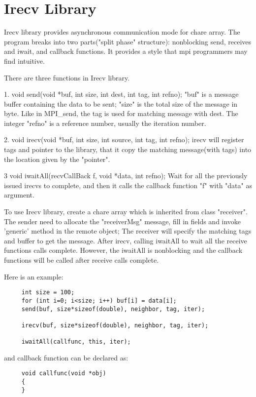 \section{Irecv Library}

{\sc Irecv} library provides asynchronous communication mode for chare array. The program breaks into two parts("split phase" structure): nonblocking send, receives and iwait, and callback functions. It provides a style that mpi programmers may find intuitive. 

There are three functions in Irecv library.

1. void send(void *buf, int size, int dest, int tag, int refno);
"buf" is a message buffer containing the data to be sent; "size" is the total size of the message in byte. 
Like in MPI\_send, the tag is used for matching message with dest. The integer "refno" is a reference number, usually the iteration number.
  

2. void irecv(void *buf, int size, int source, int tag, int refno);
irecv will register tags and pointer to the library, that it copy the matching message(with tags) into the location given by the "pointer".

3 void iwaitAll(recvCallBack f, void *data, int refno);
Wait for all the previously issued irecvs to complete, and then it calls the callback function "f" with "data" as argument.

To use Irecv library, create a chare array which is inherited from class "receiver". The sender need to allocate the "receiverMsg" message, fill in fields and invoke 'generic' method in the remote object; The receiver will specify the matching tags and buffer to get the message. After irecv, calling iwaitAll to wait all the receive functions calls complete. However, the iwaitAll is nonblocking and the callback functions will be called after receive calls complete.

Here is an example:

\begin{verbatim}
     int size = 100;
     for (int i=0; i<size; i++) buf[i] = data[i];
     send(buf, size*sizeof(double), neighbor, tag, iter);

     irecv(buf, size*sizeof(double), neighbor, tag, iter);

     iwaitAll(callfunc, this, iter);
\end{verbatim}

and callback function can be declared as:

\begin{verbatim}
     void callfunc(void *obj)
     {
     }
\end{verbatim}
